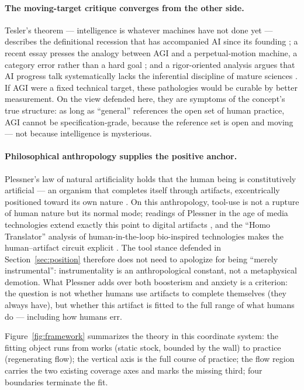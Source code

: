 \documentclass[10pt]{article}
\begin{document}
\paragraph{The moving-target critique converges from the other side.}
Tesler's theorem --- intelligence is whatever machines have not done yet --- describes the definitional recession that has accompanied AI since its founding \cite{tesler1997effect}; a recent essay presses the analogy between AGI and a perpetual-motion machine, a category error rather than a hard goal \cite{imeri2025benefits}; and a rigor-oriented analysis argues that AI progress talk systematically lacks the inferential discipline of mature sciences \cite{nguyen2026rigor}. If AGI were a fixed technical target, these pathologies would be curable by better measurement. On the view defended here, they are symptoms of the concept's true structure: as long as ``general'' references the open set of human practice, AGI cannot be specification-grade, because the reference set is open and moving --- not because intelligence is mysterious.

\paragraph{Philosophical anthropology supplies the positive anchor.}
Plessner's law of natural artificiality holds that the human being is constitutively artificial --- an organism that completes itself through artifacts, excentrically positioned toward its own nature \cite{plessner1928levels}. On this anthropology, tool-use is not a rupture of human nature but its normal mode; readings of Plessner in the age of media technologies extend exactly this point to digital artifacts \cite{demul2014philosophical}, and the ``Homo Translator'' analysis of human-in-the-loop bio-inspired technologies makes the human--artifact circuit explicit \cite{tamborini2025homo}. The tool stance defended in Section~\ref{sec:position} therefore does not need to apologize for being ``merely instrumental'': instrumentality is an anthropological constant, not a metaphysical demotion. What Plessner adds over both boosterism and anxiety is a criterion: the question is not whether humans use artifacts to complete themselves (they always have), but whether this artifact is fitted to the full range of what humans do --- including how humans err.

Figure~\ref{fig:framework} summarizes the theory in this coordinate system: the fitting object runs from works (static stock, bounded by the wall) to practice (regenerating flow); the vertical axis is the full course of practice; the flow region carries the two existing coverage axes and marks the missing third; four boundaries terminate the fit.
\end{document}
